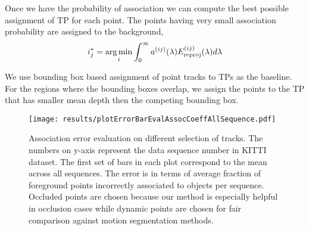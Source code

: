 Once we have the probability of association we can compute the best possible
assignment of TP for each point. The points having very small association
probability are assigned to the background,
\begin{align}
  i^*_{j} = \operatorname*{\arg\min}_{i} \int_0^\infty a^{(ij)}(\lambda) E^{(ij)}_{\text{reproj}}(\lambda) d\lambda
\end{align}

We use bounding box based assignment of point tracks to TPs as the baseline.
For the regions where the bounding boxes overlap, we assign the points to the
TP that has smaller mean depth then the competing bounding box.

\begin{figure*}
\texttt{[image: results/plotErrorBarEvalAssocCoeffAllSequence.pdf]}
  \caption{Association error evaluation on different selection of tracks. The
    numbers on y-axis represent the data sequence number in KITTI dataset. The
    first set of bars in each plot correspond to the mean across all sequences.
    The error is in terms of average fraction of foreground points incorrectly
    associated to objects per sequence. Occluded points are chosen because our
    method is especially helpful in occlusion cases while dynamic points are
    chosen for fair comparison against motion segmentation methods.}
\label{fig:assoc-occ-results}
\end{figure*}


